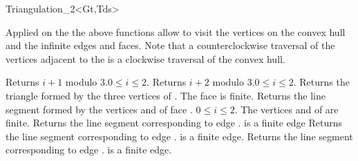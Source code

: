 \begin{ccClassTemplate}{Triangulation_2<Gt,Tds>}

Applied on the 
the above  functions  allow to visit the vertices on the convex hull and
the infinite edges and faces. Note that a counterclockwise
traversal of the vertices adjacent to the  is
a clockwise traversal of the convex hull.

\ccGlue
{}
\ccGlue
{}
\ccGlue
{}
\ccGlue
{} {}
\ccGlue
{}




{Returns $i+1$ modulo 3.\ccPrecond $0\leq i \leq 2$.}
\ccGlue
{}
{Returns $i+2$ modulo 3.\ccPrecond $0\leq i \leq 2$.}
\ccGlue
{}
{Returns the triangle formed by the three vertices of .
 \ccPrecond The face is finite.}
\ccGlue
{}
{Returns the line segment formed by the vertices 
 and  of face .
\ccPrecond $0\leq i \leq 2$. The vertices 
 and  of  
 are finite.}
\ccGlue
{}
{Returns the line segment corresponding to edge .
\ccPrecond {} is a finite edge}
\ccGlue
{}
{Returns the line segment corresponding to edge .
\ccPrecond {} is a finite edge.}
\ccGlue
{}
{Returns the line segment corresponding to edge .
\ccPrecond {} is a finite edge.}


\begin{ccAdvanced}


\end{ccAdvanced}
\end{ccClassTemplate}
